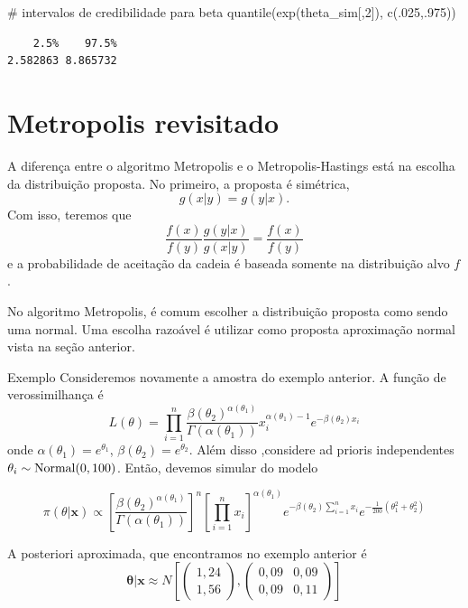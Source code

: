 \documentclass[
  letterpaper,
  DIV=11,
  numbers=noendperiod]{scrreprt}
\newenvironment{Shaded}{\begin{snugshade}}{\end{snugshade}}
\newcommand{\CommentTok}[1]{\textcolor[rgb]{0.37,0.37,0.37}{#1}}
\newcommand{\DecValTok}[1]{\textcolor[rgb]{0.68,0.00,0.00}{#1}}
\newcommand{\FunctionTok}[1]{\textcolor[rgb]{0.28,0.35,0.67}{#1}}
\newcommand{\NormalTok}[1]{\textcolor[rgb]{0.00,0.23,0.31}{#1}}
\theoremstyle{definition}
\theoremstyle{plain}
\theoremstyle{definition}
\theoremstyle{remark}
\begin{document}
\begin{Shaded}
\begin{Highlighting}[]
\CommentTok{\# intervalos de credibilidade para beta}
\FunctionTok{quantile}\NormalTok{(}\FunctionTok{exp}\NormalTok{(theta\_sim[,}\DecValTok{2}\NormalTok{]), }\FunctionTok{c}\NormalTok{(.}\DecValTok{025}\NormalTok{,.}\DecValTok{975}\NormalTok{))}
\end{Highlighting}
\end{Shaded}

\begin{verbatim}
    2.5%    97.5% 
2.582863 8.865732 
\end{verbatim}

\section{Metropolis revisitado}\label{metropolis-revisitado}

A diferença entre o algoritmo Metropolis e o Metropolis-Hastings está na
escolha da distribuição proposta. No primeiro, a proposta é simétrica,
\[g(x|y)=g(y|x).\] Com isso, teremos que
\[\frac{f(x)}{f(y)}\frac{g(y|x)}{g(x|y)}=\frac{f(x)}{f(y)}\] e a
probabilidade de aceitação da cadeia é baseada somente na distribuição
alvo \(f\).

No algoritmo Metropolis, é comum escolher a distribuição proposta como
sendo uma normal. Uma escolha razoável é utilizar como proposta
aproximação normal vista na seção anterior.

Exemplo Consideremos novamente a amostra do exemplo anterior. A função
de verossimilhança é
\[L(\theta)=\prod_{i=1}^n \frac{\beta(\theta_2)^{\alpha(\theta_1)}}{\Gamma(\alpha(\theta_1))} x_i^{\alpha(\theta_1)-1}e^{-\beta(\theta_2)x_i}\]
onde \(\alpha(\theta_1)=e^{\theta_1}\),
\(\beta(\theta_2)=e^{\theta_2}\). Além disso ,considere ad prioris
independentes \(\theta_i\sim\hbox{Normal}(0,100)\). Então, devemos
simular do modelo

\[\pi(\theta|\boldsymbol{x})\propto \left[\frac{\beta(\theta_2)^{\alpha(\theta_1)}}{\Gamma(\alpha(\theta_1))}\right]^n \left[\prod_{i=1}^n x_i\right]^{\alpha(\theta_1)}e^{-\beta(\theta_2)\sum_{i=1}^{n}x_i}e^{-\frac{1}{200}(\theta_1^2 + \theta_2^2)}\]

A posteriori aproximada, que encontramos no exemplo anterior é
\[\boldsymbol{\theta}|\boldsymbol{x}\approx N \left[ \left(\begin{array}{c}1,24\\1,56 \end{array}\right),\left(\begin{array}{cc}0,09 & 0,09\\0,09 &0,11\end{array}\right)\right]\]
\end{document}
